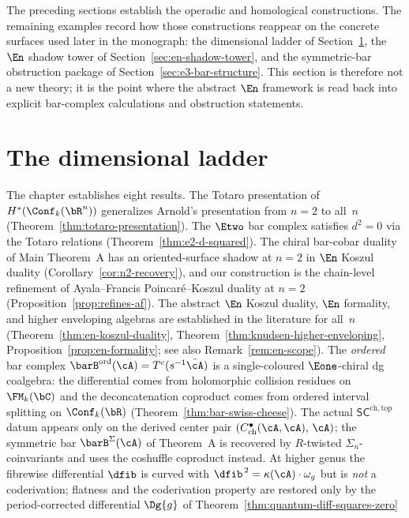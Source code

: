 The preceding sections establish the operadic and homological
constructions. The remaining examples record how those constructions
reappear on the concrete surfaces used later in the monograph: the
dimensional ladder of Section~\ref{sec:en-summary}, the
$\En$ shadow tower of Section~\ref{sec:en-shadow-tower}, and the
symmetric-bar obstruction package of
Section~\ref{sec:e3-bar-structure}. This section is therefore not a
new theory; it is the point where the abstract $\En$ framework is
read back into explicit bar-complex calculations and obstruction
statements.

\section{The dimensional ladder}
\label{sec:en-summary}

The chapter establishes eight results. The Totaro presentation
of $H^*(\Conf_k(\bR^n))$ generalizes Arnold's presentation from
$n = 2$ to all~$n$ (Theorem~\ref{thm:totaro-presentation}).
The $\Etwo$ bar complex satisfies $d^2 = 0$ via the Totaro
relations (Theorem~\ref{thm:e2-d-squared}).
The chiral bar-cobar duality of Main Theorem~A has an
oriented-surface shadow at $n = 2$ in $\En$ Koszul duality
(Corollary~\ref{cor:n2-recovery}), and our construction is the
chain-level refinement of Ayala--Francis Poincar\'e--Koszul duality
at $n = 2$ (Proposition~\ref{prop:refines-af}).
The abstract $\En$ Koszul duality, $\En$ formality, and higher
enveloping algebras are established in the literature for all~$n$
(Theorem~\ref{thm:en-koszul-duality},
Theorem~\ref{thm:knudsen-higher-enveloping},
Proposition~\ref{prop:en-formality};
see also Remark~\ref{rem:en-scope}).
The \emph{ordered} bar complex
$\barB^{\mathrm{ord}}(\cA)=T^c(s^{-1}\bar\cA)$ is a
single-coloured $\Eone$-chiral dg coalgebra: the differential
comes from holomorphic collision residues on $\FM_k(\bC)$ and
the deconcatenation coproduct comes from ordered interval
splitting on $\Conf_k(\bR)$
(Theorem~\ref{thm:bar-swiss-cheese}). The actual
$\mathsf{SC}^{\mathrm{ch,top}}$ datum appears only on the
derived center pair
$(C^\bullet_{\mathrm{ch}}(\cA,\cA),\,\cA)$; the symmetric bar
$\barB^{\Sigma}(\cA)$ of Theorem~A is recovered by $R$-twisted
$\Sigma_n$-coinvariants and uses the coshuffle coproduct
instead. At higher genus the fibrewise differential
$\dfib$ is curved with $\dfib^{\,2}=\kappa(\cA)\cdot\omega_g$
but is \emph{not} a coderivation; flatness and the coderivation
property are restored only by the period-corrected differential
$\Dg{g}$ of Theorem~\ref{thm:quantum-diff-squares-zero}
